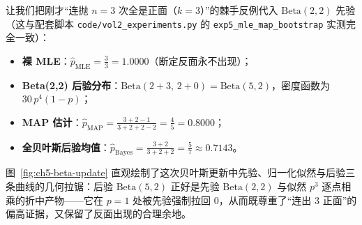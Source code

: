让我们把刚才“连抛 $n=3$ 次全是正面（$k=3$）”的棘手反例代入 $\mathrm{Beta}(2, 2)$ 先验（这与配套脚本 \texttt{code/vol2\_experiments.py} 的 \texttt{exp5\_mle\_map\_bootstrap} 实测完全一致）：
\begin{itemize}
  \item \textbf{裸 MLE}：$\hat{p}_{\text{MLE}} = \frac{3}{3} = \mathbf{1.0000}$（断定反面永不出现）；
  \item \textbf{Beta(2,2) 后验分布}：$\mathrm{Beta}(2+3,\, 2+0) = \mathrm{Beta}(5, 2)$，密度函数为 $30\,p^4(1-p)$；
  \item \textbf{MAP 估计}：$\hat{p}_{\text{MAP}} = \frac{3 + 2 - 1}{3 + 2 + 2 - 2} = \frac{4}{5} = \mathbf{0.8000}$；
  \item \textbf{全贝叶斯后验均值}：$\hat{p}_{\text{Bayes}} = \frac{3 + 2}{3 + 2 + 2} = \frac{5}{7} \approx \mathbf{0.7143}$。
\end{itemize}
图~\ref{fig:ch5-beta-update} 直观绘制了这次贝叶斯更新中先验、归一化似然与后验三条曲线的几何拉锯：后验 $\mathrm{Beta}(5,2)$ 正好是先验 $\mathrm{Beta}(2,2)$ 与似然 $p^3$ 逐点相乘的折中产物——它在 $p=1$ 处被先验强制拉回 $0$，从而既尊重了“连出 3 正面”的偏高证据，又保留了反面出现的合理余地。

